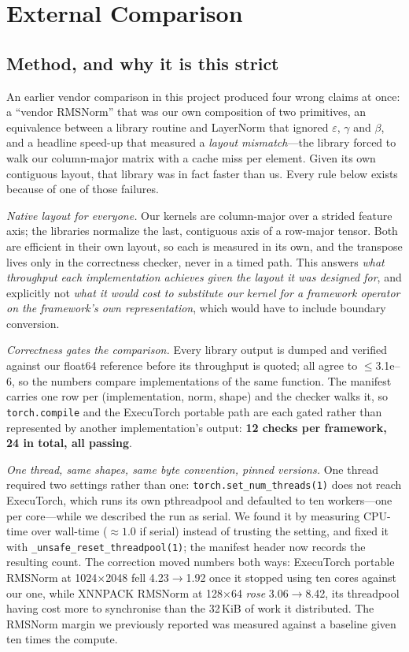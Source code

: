 \documentclass[conference,10pt]{IEEEtran}
\newcommand{\code}[1]{\texttt{\small #1}}
\begin{document}
\section{External Comparison}
\label{sec:external}

\subsection{Method, and why it is this strict}

An earlier vendor comparison in this project produced four wrong claims at once:
a ``vendor RMSNorm'' that was our own composition of two primitives, an
equivalence between a library routine and LayerNorm that ignored $\varepsilon$,
$\gamma$ and $\beta$, and a headline speed-up that measured a \emph{layout
mismatch}---the library forced to walk our column-major matrix with a
cache miss per element. Given its own contiguous layout, that library was in
fact faster than us. Every rule below exists because of one of those failures.

\emph{Native layout for everyone.} Our kernels are column-major over a strided
feature axis; the libraries normalize the last, contiguous axis of a row-major
tensor. Both are efficient in their own layout, so each is measured in its own,
and the transpose lives only in the correctness checker, never in a timed path.
This answers \emph{what throughput each implementation achieves given the layout
it was designed for}, and explicitly not \emph{what it would cost to substitute
our kernel for a framework operator on the framework's own representation},
which would have to include boundary conversion.

\emph{Correctness gates the comparison.} Every library output is dumped and
verified against our float64 reference before its throughput is quoted; all
agree to $\le$3.1e--6, so the numbers compare implementations of the same
function. The manifest carries one row per (implementation, norm, shape) and the
checker walks it, so \code{torch.compile} and the ExecuTorch portable path are
each gated rather than represented by another implementation's output:
\textbf{12 checks per framework, 24 in total, all passing}.

\emph{One thread, same shapes, same byte convention, pinned versions.} One
thread required two settings rather than one: \code{torch.set\_num\_threads(1)}
does not reach ExecuTorch, which runs its own pthreadpool and defaulted to ten
workers---one per core---while we described the run as serial. We found it by
measuring CPU-time over wall-time (${\approx}1.0$ if serial) instead of trusting
the setting, and fixed it with \code{\_unsafe\_reset\_threadpool(1)}; the
manifest header now records the resulting count. The correction moved numbers
both ways: ExecuTorch portable RMSNorm at 1024$\times$2048 fell 4.23$\to$1.92
once it stopped using ten cores against our one, while XNNPACK RMSNorm at
128$\times$64 \emph{rose} 3.06$\to$8.42, its threadpool having cost more to
synchronise than the 32\,KiB of work it distributed. The RMSNorm margin we
previously reported was measured against a baseline given ten times the compute.
\end{document}
